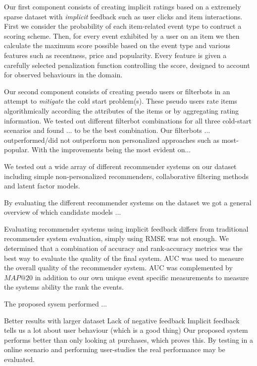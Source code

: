 Our first component consists of creating implicit ratings based on a extremely
sparse dataset with \textit{implicit} feedback such as user clicks and item
interactions. First we consider the probability of each item-related event type
to contruct a scoring scheme. Then, for every event exhibited by a user on an
item we then calculate the maximum score possible based on the event type and
various features such as recentness, price and popularity. Every feature is
given a carefully selected penalization function controlling the score,
designed to account for observed behaviours in the domain.

Our second component consists of creating pseudo users or filterbots in an
attempt to \textit{mitigate} the cold start problem(s). These pseudo users rate
items algorithmically according the attributes of the items or by aggregating
rating information. We tested out different filterbot combinations for all
three cold-start scenarios and found ...  to be the best combination. Our
filterbots ... outperformed/did not outperform non personalized approaches such
as most-popular. With the improvements being the most evident on...

We tested out a wide array of different recommender systems on our dataset
including simple non-personalized recommenders, collaborative filtering methods
and latent factor models.

By evaluating the different recommender systems on the dataset we got a general
overview of which candidate models ... 


Evaluating recommender systems using implicit feedback differs from traditional
recommender system evaluation, simply using RMSE was not enough.  We determined
that a combination of accuracy and rank-accuracy metrics was the best way to
evaluate the quality of the final system. AUC was used to measure the overall
quality of the recommender system. AUC was complemented by $MAP@20$ in addition
to our own unique event specific measurements to measure the systems ability
the rank the events.

The proposed sysem performed ...

Better results with larger dataset
Lack of negative feedback
Implicit feedback tells us a lot about user behaviour (which is a good thing)
Our proposed system performs better than only looking at purchases, which
proves this.
By testing in a online scenario and performing user-studies the real
performance may be evaluated.

